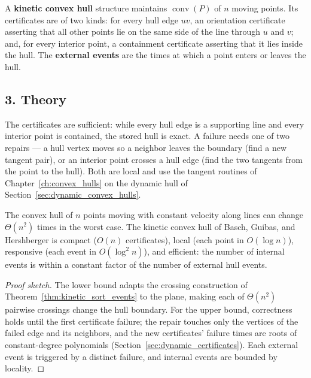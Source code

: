 \begin{definition}\label{def:kinetic_convex_hull}
  A \textbf{kinetic convex hull} structure maintains $\operatorname{conv}(P)$
  of $n$ moving points. Its certificates are of two kinds: for every hull
  edge $uv$, an orientation certificate asserting that all other points lie
  on the same side of the line through $u$ and $v$; and, for every interior
  point, a containment certificate asserting that it lies inside the hull.
  The \textbf{external events} are the times at which a point enters or
  leaves the hull.
\end{definition}

\subsection{3. Theory}

The certificates are sufficient: while every hull edge is a supporting line
and every interior point is contained, the stored hull is exact. A failure
needs one of two repairs --- a hull vertex moves so a neighbor leaves the
boundary (find a new tangent pair), or an interior point crosses a hull edge
(find the two tangents from the point to the hull). Both are local and use
the tangent routines of Chapter~\ref{ch:convex_hulls} on the dynamic hull of
Section~\ref{sec:dynamic_convex_hulls}.

\begin{theorem}\label{thm:kinetic_hull_bounds}
  The convex hull of $n$ points moving with constant velocity along lines
  can change $\Theta(n^2)$ times in the worst case. The kinetic convex hull
  of Basch, Guibas, and Hershberger \cite{basch1999} is compact ($O(n)$
  certificates), local (each point in $O(\log n)$), responsive (each event
  in $O(\log^2 n)$), and efficient: the number of internal events is within
  a constant factor of the number of external hull events.
\end{theorem}

\begin{proof}[Proof sketch]
  The lower bound adapts the crossing construction of
  Theorem~\ref{thm:kinetic_sort_events} to the plane, making each of
  $\Theta(n^2)$ pairwise crossings change the hull boundary. For the upper
  bound, correctness holds until the first certificate failure; the repair
  touches only the vertices of the failed edge and its neighbors, and the
  new certificates' failure times are roots of constant-degree polynomials
  (Section~\ref{sec:dynamic_certificates}). Each external event is triggered
  by a distinct failure, and internal events are bounded by locality.
\end{proof}

